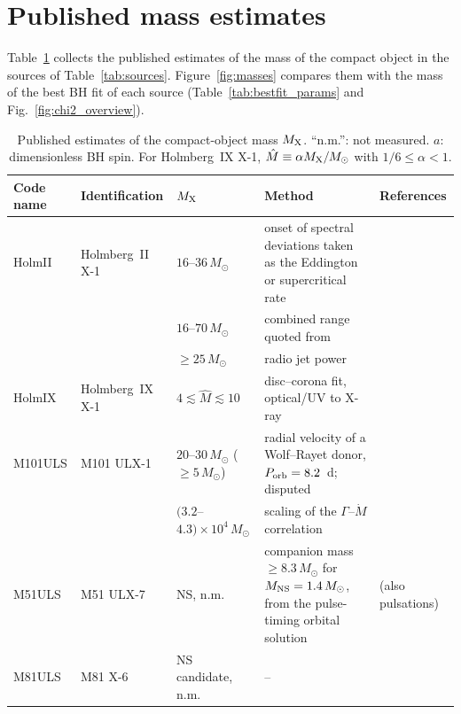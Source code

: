 
\section{Published mass estimates}
\label{app:masses}

Table~\ref{tab:masses} collects the published estimates of the mass of the compact object in the sources of Table~\ref{tab:sources}.
Figure~\ref{fig:masses} compares them with the mass of the best BH fit of each source (Table~\ref{tab:bestfit_params} and Fig.~\ref{fig:chi2_overview}).

\begin{table}
\centering
\caption{Published estimates of the compact-object mass $M_{\rm X}$. ``n.m.'': not measured.
$a$: dimensionless BH spin. For Holmberg~IX X-1, $\hat M \equiv \alpha M_{\rm X}/M_\odot$ with $1/6 \le \alpha < 1$.}
\label{tab:masses}
\footnotesize
\begin{tabular}{@{}lp{}p{}p{}p{}@{}}
\toprule
Code name & Identification & $M_{\rm X}$ & Method & References \\
\midrule
HolmII & Holmberg~II X-1 & $16$--$36\,M_\odot$ & onset of spectral deviations taken as the Eddington or supercritical rate & \citealt{Barra2024} \\
 & & $16$--$70\,M_\odot$ & combined range quoted from \citet{Barra2024, ReyeroSerantes2024} & \citealt{Fogantini2026} \\
 & & $\geq 25\,M_\odot$ & radio jet power & \citealt{Cseh2014} \\
HolmIX & Holmberg~IX X-1 & $4 \lesssim \hat M \lesssim 10$ & disc--corona fit, optical/UV to X-ray & \citealt{Gill2021} \\
M101ULS & M101 ULX-1 & $20$--$30\,M_\odot$ ($\geq 5\,M_\odot$) & radial velocity of a Wolf--Rayet donor, $P_{\rm orb} = 8.2$~d; disputed & \citealt{Liu2013} \\
 & & $(3.2$--$4.3)\times10^{4}\,M_\odot$ & scaling of the $\Gamma$--$\dot M$ correlation & \citealt{Titarchuk2016} \\
M51ULS & M51 ULX-7\idq{} & NS, n.m. & companion mass $\geq 8.3\,M_\odot$ for $M_{\rm NS} = 1.4\,M_\odot$, from the pulse-timing orbital solution & \citealt{RodriguezCastillo2020} (also pulsations) \\
M81ULS & M81 X-6\idq{} & NS candidate, n.m. & -- & \citealt{Amato2023} \\

\end{tabular}
\end{table}
